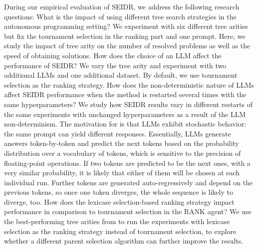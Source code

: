 During our empirical evaluation of SEIDR, we address the following research questions:
What is the impact of using different tree search strategies
in the autonomous programming setting? 
We experiment with six different tree arities but fix the tournament selection in the ranking part and one prompt. 
Here, we study the impact of tree arity on the number of resolved problems as well as the speed of obtaining solutions.   
How does the choice of an LLM affect the performance of SEIDR? 
We vary the tree arity and experiment with two additional LLMs and one additional dataset.
By default, we use tournament selection as the ranking strategy. 
How does the non-deterministic nature of LLMs affect SEIDR performance when the method is restarted several times with the same hyperparameters?
We study how SEIDR results vary in different restarts of the same experiments with unchanged hyperparameters as a result of the LLM non-determinism. 
The motivation for \rqmultirun{} is that LLMs exhibit stochastic behavior: the same prompt can yield different responses. 
Essentially, LLMs generate answers token-by-token and predict the next tokens based on the probability distribution over a vocabulary of tokens, which is sensitive to the precision of floating-point operations. 
If two tokens are predicted to be the next ones, with a very similar probability, it is likely that either of them will be chosen at each individual run. 
Further tokens are generated auto-regressively and depend on the previous tokens, so once one token diverges, the whole sequence is likely to diverge, too. 
How does the lexicase selection-based ranking strategy impact performance in comparison to tournament selection in the RANK agent? 
We use the best-performing tree arities from \rqmultirun{} to run the experiments with lexicase selection as the ranking strategy instead of tournament selection, to explore whether a different parent selection algorithm can further improve the results.


